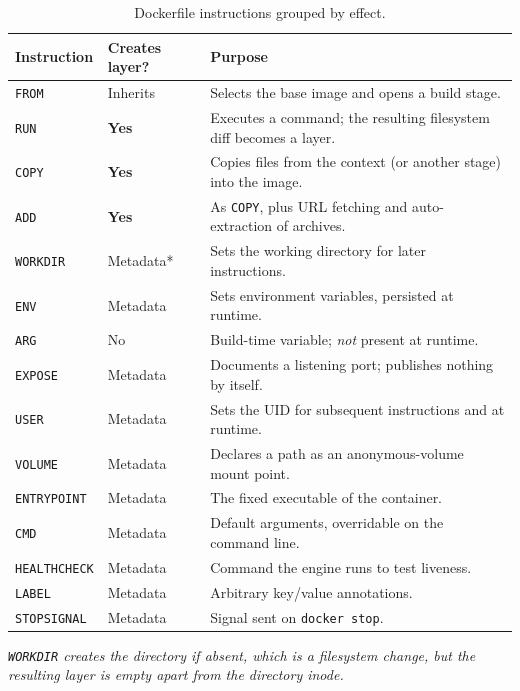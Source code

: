 \documentclass[10pt,a4paper]{article}
\newcommand{\cmd}[1]{\texttt{\small #1}}
\begin{document}
\begin{table}[htbp]
\centering
\caption{Dockerfile instructions grouped by effect.}
\label{tab:instr}
\footnotesize
\begin{tabularx}{\linewidth}{@{}l l X@{}}
\toprule
\textbf{Instruction} & \textbf{Creates layer?} & \textbf{Purpose} \\
\midrule
\texttt{FROM}       & Inherits & Selects the base image and opens a build stage. \\
\texttt{RUN}        & \textbf{Yes} & Executes a command; the resulting filesystem diff becomes a layer. \\
\texttt{COPY}       & \textbf{Yes} & Copies files from the context (or another stage) into the image. \\
\texttt{ADD}        & \textbf{Yes} & As \texttt{COPY}, plus URL fetching and auto-extraction of archives. \\
\texttt{WORKDIR}    & Metadata* & Sets the working directory for later instructions. \\
\texttt{ENV}        & Metadata & Sets environment variables, persisted at runtime. \\
\texttt{ARG}        & No       & Build-time variable; \emph{not} present at runtime. \\
\texttt{EXPOSE}     & Metadata & Documents a listening port; publishes nothing by itself. \\
\texttt{USER}       & Metadata & Sets the UID for subsequent instructions and at runtime. \\
\texttt{VOLUME}     & Metadata & Declares a path as an anonymous-volume mount point. \\
\texttt{ENTRYPOINT} & Metadata & The fixed executable of the container. \\
\texttt{CMD}        & Metadata & Default arguments, overridable on the command line. \\
\texttt{HEALTHCHECK}& Metadata & Command the engine runs to test liveness. \\
\texttt{LABEL}      & Metadata & Arbitrary key/value annotations. \\
\texttt{STOPSIGNAL} & Metadata & Signal sent on \cmd{docker stop}. \\
\bottomrule
\end{tabularx}
\vspace{2pt}
{\footnotesize\itshape * \texttt{WORKDIR} creates the directory if absent,
which is a filesystem change, but the resulting layer is empty apart from
the directory inode.\par}
\end{table}
\end{document}
